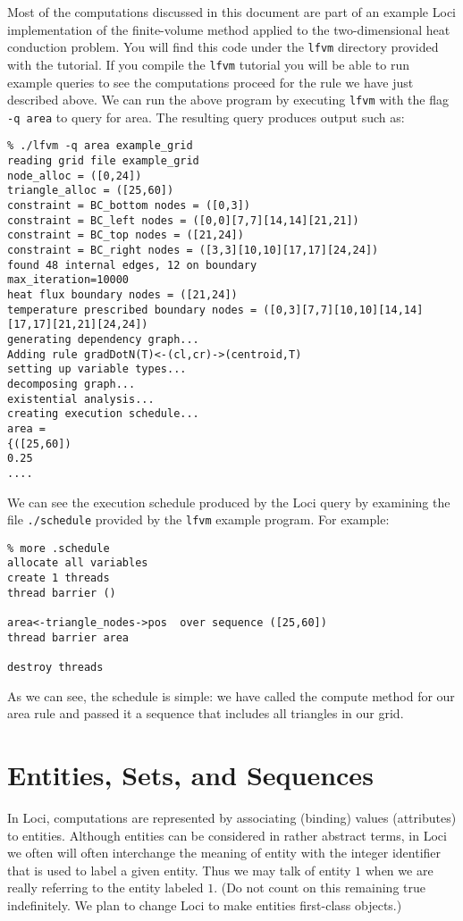 \documentclass[10pt,epsf]{book}
\begin{document}
Most of the computations discussed in this document are part of an example
Loci implementation of the finite-volume method applied to the
two-dimensional heat conduction problem.  You will find this code
under the {\tt lfvm} directory provided with the tutorial.  If you
compile the {\tt lfvm} tutorial you will be able to run example
queries to see the computations proceed for the rule we have just
described above.  We can run the above program by executing {\tt lfvm}
with the flag {\tt -q area} to query for area.  The resulting query
produces output such as:

\begin{verbatim}
% ./lfvm -q area example_grid
reading grid file example_grid
node_alloc = ([0,24])
triangle_alloc = ([25,60])
constraint = BC_bottom nodes = ([0,3])
constraint = BC_left nodes = ([0,0][7,7][14,14][21,21])
constraint = BC_top nodes = ([21,24])
constraint = BC_right nodes = ([3,3][10,10][17,17][24,24])
found 48 internal edges, 12 on boundary
max_iteration=10000
heat flux boundary nodes = ([21,24])
temperature prescribed boundary nodes = ([0,3][7,7][10,10][14,14][17,17][21,21][24,24])
generating dependency graph...
Adding rule gradDotN(T)<-(cl,cr)->(centroid,T)
setting up variable types...
decomposing graph...
existential analysis...
creating execution schedule...
area = 
{([25,60])
0.25
....
\end{verbatim}

We can see the execution schedule produced by the Loci query by
examining the file {\tt ./schedule} provided by the {\tt lfvm} example
program.  For example:

\begin{verbatim}
% more .schedule
allocate all variables
create 1 threads
thread barrier ()

area<-triangle_nodes->pos  over sequence ([25,60])
thread barrier area

destroy threads
\end{verbatim}

As we can see, the schedule is simple:  we have called the compute
method for our area rule and passed it a sequence that includes all
triangles in our grid.




\section{Entities, Sets, and Sequences}

In Loci, computations are represented by associating (binding) values
(attributes) to entities.  Although entities can be considered in
rather abstract terms, in Loci we often will often interchange the
meaning of entity with the integer identifier that is used to label a
given entity.  Thus we may talk of entity $1$ when we are really
referring to the entity labeled $1$.  (Do not count on this remaining
true indefinitely.  We plan to change Loci to make entities
first-class objects.) 
\end{document}

